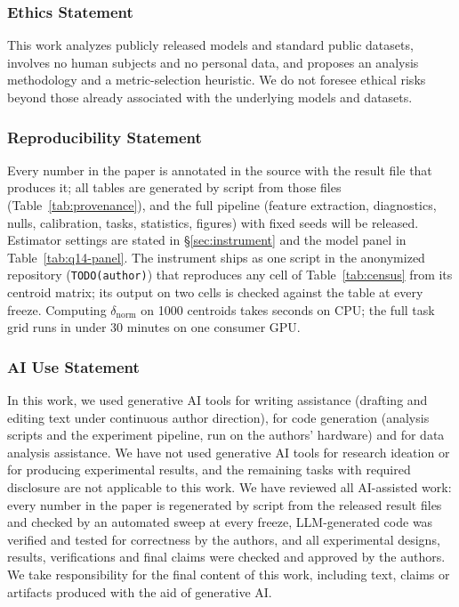 \documentclass{article}
\begin{document}
\subsubsection*{Ethics Statement}
This work analyzes publicly released models and standard public datasets, involves no human subjects and no personal data, and proposes an analysis methodology and a metric-selection heuristic. We do not foresee ethical risks beyond those already associated with the underlying models and datasets.

\subsubsection*{Reproducibility Statement}
Every number in the paper is annotated in the source with the result file that produces it; all tables are generated by script from those files (Table~\ref{tab:provenance}), and the full pipeline (feature extraction, diagnostics, nulls, calibration, tasks, statistics, figures) with fixed seeds will be released. Estimator settings are stated in \S\ref{sec:instrument} and the model panel in Table~\ref{tab:q14-panel}. The instrument ships as one script in the anonymized repository (\texttt{TODO(author)}) that reproduces any cell of Table~\ref{tab:census} from its centroid matrix; its output on two cells is checked against the table at every freeze. Computing $\delta_{\text{norm}}$ on 1000 centroids takes seconds on CPU; the full task grid runs in under 30 minutes on one consumer GPU.

\subsubsection*{AI Use Statement}
In this work, we used generative AI tools for writing assistance (drafting and editing text under continuous author direction), for code generation (analysis scripts and the experiment pipeline, run on the authors' hardware) and for data analysis assistance. We have not used generative AI tools for research ideation or for producing experimental results, and the remaining tasks with required disclosure are not applicable to this work. We have reviewed all AI-assisted work: every number in the paper is regenerated by script from the released result files and checked by an automated sweep at every freeze, LLM-generated code was verified and tested for correctness by the authors, and all experimental designs, results, verifications and final claims were checked and approved by the authors. We take responsibility for the final content of this work, including text, claims or artifacts produced with the aid of generative AI.
\end{document}
